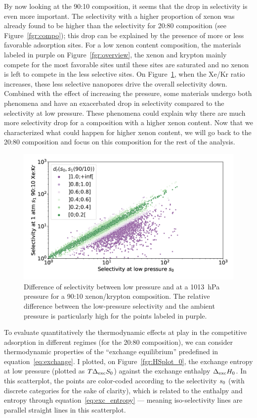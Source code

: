 \documentclass[main.tex]{subfiles}
\begin{document}
By now looking at the 90:10 composition, it seems that the drop in selectivity is even more important. The selectivity with a higher proportion of xenon was already found to be higher than the selectivity for 20:80 composition (see Figure~\ref{fgr:compo}); this drop can be explained by the presence of more or less favorable adsorption sites. For a low xenon content composition, the materials labeled in purple on Figure~\ref{fgr:overview}, the xenon and krypton mainly compete for the most favorable sites until these sites are saturated and no xenon is left to compete in the less selective sites. On Figure~\ref{fgr:overview_9010}, when the Xe/Kr ratio increases, these less selective nanopores drive the overall selectivity down. Combined with the effect of increasing the pressure, some materials undergo both phenomena and have an exacerbated drop in selectivity compared to the selectivity at low pressure. These phenomena could explain why there are much more selectivity drop for a composition with a higher xenon content. Now that we characterized what could happen for higher xenon content, we will go back to the 20:80 composition and focus on this composition for the rest of the analysis.

\begin{figure}[t]
  \centering
    \includegraphics[width=0.6\linewidth]{figures/2-thermo/s_0_vs_s_9010_overview_log.jpg}
    \caption{Difference of selectivity between low pressure and at a \SI{1013}{\hecto\pascal} pressure for a 90:10 xenon/krypton composition. The relative difference between the low-pressure selectivity and the ambient pressure is particularly high for the points labeled in purple.}\label{fgr:overview_9010}
\end{figure}
  
To evaluate quantitatively the thermodynamic effects at play in the competitive adsorption in different regimes (for the 20:80 composition), we can consider thermodynamic properties of the ``exchange equilibrium'' predefined in equation~\ref{eq:exchange}. I plotted, on Figure~\ref{fgr:HSplot_0}, the exchange entropy at low pressure (plotted as $T\Delta_{\text{exc}}S_{\text{0}}$) against the exchange enthalpy $\Delta_{\text{exc}}H_{\text{0}}$. In this scatterplot, the points are color-coded according to the selectivity $s_{\text{0}}$ (with discrete categories for the sake of clarity), which is related to the enthalpy and entropy through equation~\ref{eq:exc_entropy} --- meaning iso-selectivity lines are parallel straight lines in this scatterplot.
  
\end{document}
